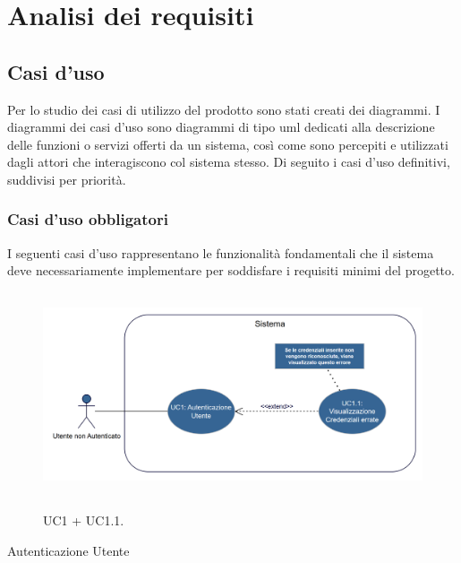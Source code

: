 \chapter{Analisi dei requisiti}
\label{chap:analisi-requisiti}

\section{Casi d'uso}
Per lo studio dei casi di utilizzo del prodotto sono stati creati dei diagrammi.
I diagrammi dei casi d'uso sono diagrammi di tipo \gls{uml} dedicati alla descrizione delle funzioni o servizi offerti da un sistema, così come sono percepiti e utilizzati dagli attori che interagiscono col sistema stesso.
Di seguito i casi d'uso definitivi, suddivisi per priorità.

\subsection{Casi d'uso obbligatori}
I seguenti casi d'uso rappresentano le funzionalità fondamentali che il sistema deve necessariamente implementare per soddisfare i requisiti minimi del progetto.

\begin{figure}[htbp]
    \centering
    \includegraphics[alt={Diagramma UML Autenticazione Utente}, height=6cm]{img/usecase/UC1+UC1.1.png}
    \caption{UC1 + UC1.1.}
    \label{fig:uc1_login}
\end{figure}

\begin{usecase}{1}{Autenticazione Utente}
\label{uc:uc1_login}
\end{usecase}

